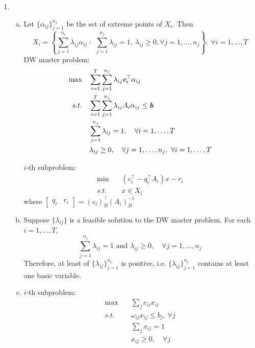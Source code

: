 \begin{enumerate}
\newpage
\item 
{}
\begin{enumerate}[(a)]
	\item Let $\{\alpha_{ij}\}_{j=1}^{n_j}$ be the set of extreme points of $X_i$. Then
	\[
	X_i = \left\{\sum_{j=1}^{n_j} \lambda_{ij} \alpha_{ij} ~:~~\sum_{j=1}^{n_j}\lambda_{ij}=1,~\lambda_{ij} \ge 0, \forall j=1,\ldots,n_j \right\},~\forall i=1,\ldots,T
	\]
	DW master problem:
	\begin{align*}
	\max \quad &\sum_{i=1}^T\sum_{j=1}^{n_j}\lambda_{ij} \textit{\textbf{c}}_i^\top \alpha_{ij} \\
	s.t.\quad &\sum_{i=1}^T\sum_{j=1}^{n_j}\lambda_{ij} A_i \alpha_{ij}\le \textit{\textbf{b}}\\
	&\sum_{j=1}^{n_j}\lambda_{ij}=1,\quad \forall i=1,\ldots,T\\
	&\lambda_{ij} \ge 0, \quad \forall j=1,\ldots,n_j, ~\forall i=1,\ldots,T
	\end{align*}
	
	$i$-th subproblem:
	\begin{align*}
	\min \quad &(c_i^\top - q_i^\top A_i)x - r_i \\
	s.t.\quad &x\in X_i
	\end{align*}
	where $\begin{bmatrix}
	q_r & r_i
	\end{bmatrix} = (c_{i})_B^\top (A_i)_B^{-1}$
	\item Suppose $\{\lambda_{ij}\}$ is a feasible solution to the DW master problem. For each $i=1,\ldots,T$,
	\[
	\sum_{j=1}^{n_j}\lambda_{ij}=1 \text{ and }\lambda_{ij} \ge 0, \quad \forall j=1,\ldots,n_j
	\]
	Therefore, at least of $\{\lambda_{ij}\}_{j=1}^{n_j}$ is positive, i.e. $\{\lambda_{ij}\}_{j=1}^{n_j}$ contains at least one basic variable.
	
	\item $i$-th subproblem:
	\begin{align*}
	\max \quad &\sum_{j}c_{ij}x_{ij} \\
	s.t.\quad &\omega_{ij}x_{ij}\le b_j,~\forall j\\
	&\sum_{j}x_{ij}=1\\
	&x_{ij} \ge 0, \quad \forall j
	\end{align*}
\end{enumerate}

\end{enumerate}